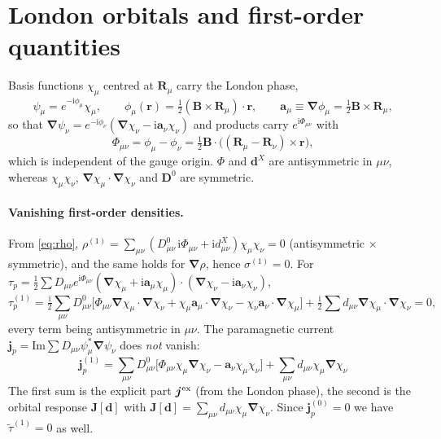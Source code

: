 \documentclass[11pt,a4paper]{article}
\newcommand{\rr}{\bm{r}}
\newcommand{\grad}{\bm{\nabla}}
\newcommand{\jp}{\bm{j}_p}
\newcommand{\ttil}{\tilde\tau}
\newcommand{\Dm}{\mathbf{D}}
\newcommand{\ci}{\mathrm{i}}
\begin{document}
\section{London orbitals and first-order quantities}

Basis functions $\chi_\mu$ centred at $\bm R_\mu$ carry the London phase,
\begin{equation}
\psi_\mu=e^{-\ci\phi_\mu}\chi_\mu,\qquad
\phi_\mu(\rr)=\tfrac12(\bm B\times\bm R_\mu)\cdot\rr,\qquad
\bm a_\mu\equiv\grad\phi_\mu=\tfrac12\bm B\times\bm R_\mu ,
\end{equation}
so that $\grad\psi_\nu=e^{-\ci\phi_\nu}(\grad\chi_\nu-\ci\bm a_\nu\chi_\nu)$ and products carry $e^{\ci\Phi_{\mu\nu}}$ with
\begin{equation}
\Phi_{\mu\nu}=\phi_\mu-\phi_\nu=\tfrac12\bm B\cdot\big((\bm R_\mu-\bm R_\nu)\times\rr\big),
\end{equation}
which is independent of the gauge origin. $\Phi$ and $\bm d^X$ are antisymmetric in $\mu\nu$, whereas $\chi_\mu\chi_\nu$, $\grad\chi_\mu\!\cdot\!\grad\chi_\nu$ and $\Dm^0$ are symmetric.

\paragraph{Vanishing first-order densities.}
From \eqref{eq:rho}, $\rho^{(1)}=\sum_{\mu\nu}(D^0_{\mu\nu}\,\ci\Phi_{\mu\nu}+\ci d^X_{\mu\nu})\chi_\mu\chi_\nu=0$ (antisymmetric $\times$ symmetric), and the same holds for $\grad\rho$, hence $\sigma^{(1)}=0$. For
$\tau_p=\tfrac12\sum D_{\mu\nu}e^{\ci\Phi_{\mu\nu}}(\grad\chi_\mu+\ci\bm a_\mu\chi_\mu)\!\cdot\!(\grad\chi_\nu-\ci\bm a_\nu\chi_\nu)$,
\begin{equation}
\tau_p^{(1)}=\tfrac{\ci}{2}\sum_{\mu\nu}D^0_{\mu\nu}\Big[\Phi_{\mu\nu}\grad\chi_\mu\!\cdot\!\grad\chi_\nu+\chi_\mu\bm a_\mu\!\cdot\!\grad\chi_\nu-\chi_\nu\bm a_\nu\!\cdot\!\grad\chi_\mu\Big]+\tfrac{\ci}2\sum d_{\mu\nu}\grad\chi_\mu\!\cdot\!\grad\chi_\nu=0 ,
\end{equation}
every term being antisymmetric in $\mu\nu$. The paramagnetic current $\jp=\mathrm{Im}\sum D_{\mu\nu}\psi_\mu^*\grad\psi_\nu$ does \emph{not} vanish:
\begin{equation}
\boxed{\ \jp^{(1)}=\sum_{\mu\nu}D^0_{\mu\nu}\Big[\Phi_{\mu\nu}\chi_\mu\grad\chi_\nu-\bm a_\nu\chi_\mu\chi_\nu\Big]+\sum_{\mu\nu}d_{\mu\nu}\chi_\mu\grad\chi_\nu\ }
\label{eq:j1}
\end{equation}
The first sum is the explicit part $\bm j^{\rm ex}$ (from the London phase), the second is the orbital response $\bm J[\bm d]$ with
$\bm J[\bm d]=\sum_{\mu\nu}d_{\mu\nu}\chi_\mu\grad\chi_\nu$. Since $\jp^{(0)}=0$ we have $\ttil^{(1)}=0$ as well.
\end{document}
